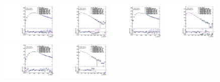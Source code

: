 \begin{figure}[htbp!]
\begin{center}
\includegraphics[width=0.24\textwidth,angle=-90]{figures/boosted/AppendixReweight/Compare/Data_TwoTag_split_Sideband_directcompare_leadHCand_trk0_Pt_1.pdf}
\includegraphics[width=0.24\textwidth,angle=-90]{figures/boosted/AppendixReweight/Compare/Data_TwoTag_split_Sideband_directcompare_leadHCand_trk1_Pt_1.pdf}
\includegraphics[width=0.24\textwidth,angle=-90]{figures/boosted/AppendixReweight/Compare/Data_TwoTag_split_Sideband_directcompare_sublHCand_trk0_Pt_1.pdf}
\includegraphics[width=0.24\textwidth,angle=-90]{figures/boosted/AppendixReweight/Compare/Data_TwoTag_split_Sideband_directcompare_sublHCand_trk1_Pt_1.pdf}\\
\includegraphics[width=0.24\textwidth,angle=-90]{figures/boosted/AppendixReweight/Compare/Data_TwoTag_split_Control_directcompare_leadHCand_trk0_Pt_1.pdf}
\includegraphics[width=0.24\textwidth,angle=-90]{figures/boosted/AppendixReweight/Compare/Data_TwoTag_split_Control_directcompare_leadHCand_trk1_Pt_1.pdf}

\end{center}
\end{figure}
